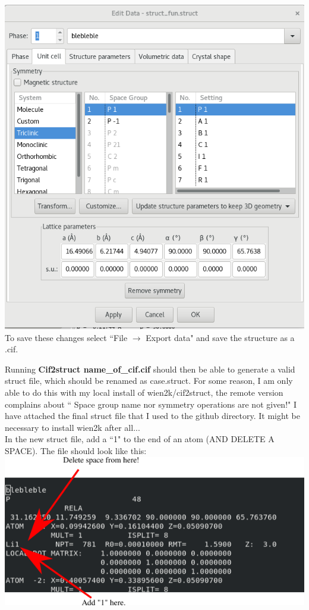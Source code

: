 \documentclass[12pt]{article}
\begin{document}
\includegraphics[scale=0.3]{./images/vesta_struct_edit.png}\\

To save these changes select ``File $\to$ Export data" and save the structure as a .cif.  

Running \textbf{Cif2struct name\_of\_cif.cif} should then be able to generate a valid struct file, which should be renamed as case.struct.  For some reason, I am only able to do this with my local install of wien2k/cif2struct, the remote version complains about `` Space group name nor symmetry operations are not given!"  I have attached the final struct file that I used to the github directory. It might be necessary to install wien2k after all... 
 \\

In the new struct file, add a ``1" to the end of an atom (AND DELETE A SPACE).  The file should look like this: \\

\includegraphics[scale=0.8]{./images/break_sym.png}
\\
\end{document}
